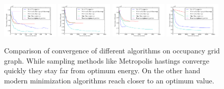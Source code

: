 \documentclass[letterpaper, 10 pt, conference]{ieeeconf} %
\begin{document}
\begin{figure}
  \includegraphics[width=0.24\textwidth]{../figures/relativeconvergence.pdf}%
  \includegraphics[width=0.24\textwidth]{../../Data/hospital_section_player/plot-time-energy.pdf}%
  \includegraphics[width=0.24\textwidth]{../../Data/hospital_player/plot-time-energy.pdf}%
  \includegraphics[width=0.24\textwidth]{../figures/convergence-albert-b.pdf}%
  \caption{Comparison of convergence of different algorithms on occupancy grid graph. While sampling methods like Metropolis hastings converge quickly they stay far from optimum energy. On the other hand modern minimization algorithms reach closer to an optimum value.}
  \label{fig:convergence-comparison}
\end{figure}
\end{document}
